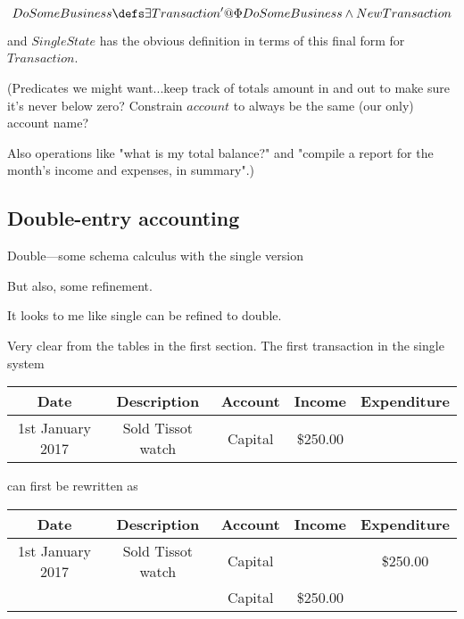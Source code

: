 \documentclass[11pt]{amsart}
\begin{document}
\[
DoSomeBusiness \defs \exists Transaction' @ \Phi DoSomeBusiness \land New Transaction
\]

and $SingleState$ has the obvious definition in terms of this final form for $Transaction$.


(Predicates we might want...keep track of totals amount in and out to make sure it's never below zero? Constrain $account$ to always be the same (our only) account name? 

Also operations like "what is my total balance?" and "compile a report for the month's income and expenses, in summary".)

\subsection{Double-entry accounting}

Double---some schema calculus with the single version

But also, some refinement.

It looks to me like single can be refined to double.

Very clear from the tables in the first section. The first transaction in the single system

 \begin{table}[h]
\begin{center}
\begin{tabular}{|c|c|c|c|c|}
Date & Description & Account & Income & Expenditure \\
\hline \hline
1st January 2017 & Sold Tissot watch & Capital & \$250.00 & \\
\end{tabular}
\end{center}
\label{default}
\end{table}%

can first be rewritten as

\begin{table}[h]
\begin{center}
\begin{tabular}{|c|c|c|c|c|}
Date & Description & Account & Income & Expenditure\\
\hline \hline
1st January 2017 & Sold Tissot watch & Capital &   &\$250.00 \\
\hline
& &  Capital & \$250.00 &  \\
\end{tabular}
\end{center}
\label{default}
\end{table}%
\end{document}
